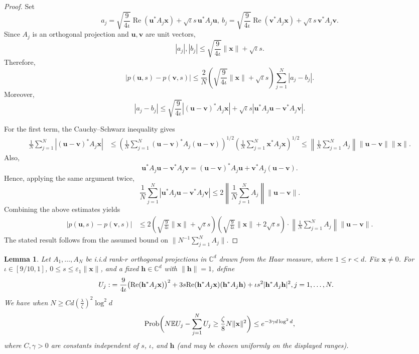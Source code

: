 \documentclass{article}
\newcommand{\C}{{\mathbb C}}
\newcommand{\E}{{\mathbb E}}
\newcommand{\Prob}{{\rm Prob}}
\newcommand{\re}{{\rm Re}}
\newcommand{\vx}{{\mathbf x}}
\newcommand{\vv}{{\mathbf v}}
\newcommand{\vu}{{\mathbf u}}
\newcommand{\vh}{{\mathbf h}}
\newcommand{\0}{{\mathbf 0}}
\newtheorem{lemma}[theorem]{Lemma}
\numberwithin{equation}{section}
\begin{document}
	\begin{proof}
		Set
		\[
		a_j=\sqrt{\frac{9}{4\iota}}\operatorname{Re}(\vu^*A_j\vx)
		+\sqrt{\iota}s\,\vu^*A_j\vu,\ 
		b_j=\sqrt{\frac{9}{4\iota}}\operatorname{Re}(\vv^*A_j\vx)
		+\sqrt{\iota}s\,\vv^*A_j\vv.
		\]
		Since $A_j$ is an orthogonal projection and $\vu,\vv$ are unit vectors,
		\[
		|a_j|,|b_j|
		\le \sqrt{\frac{9}{4\iota}}\|\vx\|+\sqrt{\iota}s.
		\]
		Therefore,
		\[
		|p(\vu,s)-p(\vv,s)|
		\le\frac{2}{N}\left(\sqrt{\frac{9}{4\iota}}\|\vx\|+\sqrt{\iota}s\right)
		\sum_{j=1}^N|a_j-b_j|.
		\]
		Moreover,
		\[
		|a_j-b_j|
		\le \sqrt{\frac{9}{4\iota}}\left|(\vu-\vv)^*A_j\vx\right|
		+\sqrt{\iota}s\left|\vu^*A_j\vu-\vv^*A_j\vv\right|.
		\]
		
		For the first term, the Cauchy--Schwarz inequality gives
		\begin{align*}
			\frac1N\sum_{j=1}^N\left|(\vu-\vv)^*A_j\vx\right|
			&\le
			\left(\frac1N\sum_{j=1}^N(\vu-\vv)^*A_j(\vu-\vv)\right)^{1/2}
			\left(\frac1N\sum_{j=1}^N\vx^*A_j\vx\right)^{1/2}\le
			\left\|\frac1N\sum_{j=1}^NA_j\right\|
			\|\vu-\vv\|\|\vx\|.
		\end{align*}
		Also,
		\[
		\vu^*A_j\vu-\vv^*A_j\vv
		=(\vu-\vv)^*A_j\vu+\vv^*A_j(\vu-\vv).
		\]
		Hence, applying the same argument twice,
		\[
		\frac1N\sum_{j=1}^N
		\left|\vu^*A_j\vu-\vv^*A_j\vv\right|
		\le
		2\left\|\frac1N\sum_{j=1}^NA_j\right\|\|\vu-\vv\|.
		\]
		Combining the above estimates yields
		\begin{align*}
			|p(\vu,s)-p(\vv,s)|
			&\le
			2\left(\sqrt{\frac{9}{4\iota}}\|\vx\|+\sqrt{\iota}s\right)
			\left(\sqrt{\frac{9}{4\iota}}\|\vx\|+2\sqrt{\iota}s\right)\cdot
			\left\|\frac1N\sum_{j=1}^NA_j\right\|\|\vu-\vv\|.
		\end{align*}
		The stated result follows from the assumed bound on $\|N^{-1}\sum_{j=1}^NA_j\|$.
	\end{proof}
	\begin{lemma}\label{lem:expectation_u}
		Let $A_1,\ldots,A_N$ be i.i.d rank-$r$ orthogonal projections in $\C^d$ drawn from the Haar measure, where $1\le r<d$.
		Fix $\vx\ne0$. For $\iota\in[9/10,1]$, $0\le s\le\varepsilon_1\|\vx\|$, and a fixed $\vh\in\C^d$ with $\|\vh\|=1$, define
		\begin{align*}
			U_j : &= \frac{9}{4\iota}\big(\re(\vh^*A_j\vx)\big)^2
			+3s\re(\vh^*A_j\vx)(\vh^*A_j\vh)+\iota s^2|\vh^*A_j\vh|^2,j=1,\dots,N .
		\end{align*} 
		We have when $N\geq Cd\left(\frac{\lambda}{\zeta}\right)^2\log^2d$
		\[
		\Prob\bigg(N\E U_j - \sum_{j=1}^{N}U_j\geq\frac{\zeta}{8}N\|\vx\|^2 \bigg)\leq e^{-3\gamma d\log^2d},
		\]
		where $C,\gamma>0$ are constants independent of $s$, $\iota$, and $\vh$ (and may be chosen uniformly on the displayed ranges).
	\end{lemma}
\end{document}

